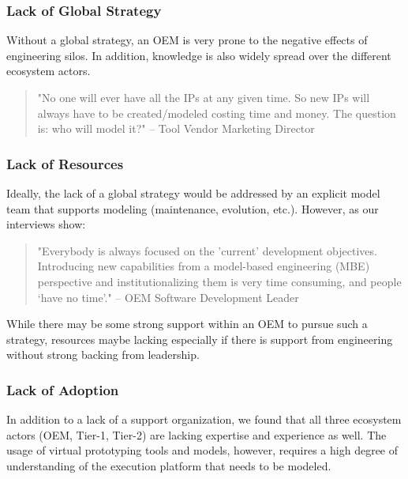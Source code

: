 \subsubsection*{Lack of Global Strategy}
Without a global strategy, an OEM is very prone to the negative effects of engineering silos.
In addition, knowledge is also widely spread over the different ecosystem actors.

\begin{quote}
"No one will ever have all the IPs at any given time. So new IPs will always have to be created/modeled costing time and money. The question is: who will model it?"
-- Tool Vendor Marketing Director
\end{quote}

\subsubsection*{Lack of Resources}
Ideally, the lack of a global strategy would be addressed by an explicit model team that supports modeling (maintenance, evolution, etc.). However, as our interviews show:

\begin{quote}
"Everybody is always focused on the 'current' development objectives. Introducing new capabilities from a model-based engineering (MBE) perspective and institutionalizing them is very time consuming, and people ‘have no time’." 
-- OEM Software Development Leader
\end{quote}

While there may be some strong support within an OEM to pursue such a strategy, resources maybe lacking especially if there is support from engineering without strong backing from leadership.

\subsubsection*{Lack of Adoption}
In addition to a lack of a support organization,
we found that all three ecosystem actors (OEM, Tier-1, Tier-2) are lacking expertise and experience as well.
The usage of virtual prototyping tools and models, however, requires a high degree of understanding of the execution platform that needs to be modeled.

